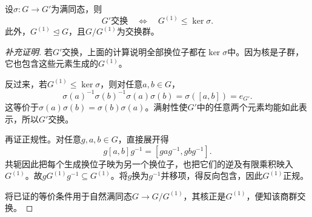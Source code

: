 \begin{theorem}\label{p2:abelianization}
设$\sigma:G\to G'$为满同态，则
\[
G'\text{交换}\quad\Longleftrightarrow\quad G^{(1)}\leq\ker\sigma.
\]
此外，$G^{(1)}\trianglelefteq G$，且$G/G^{(1)}$为交换群。
\end{theorem}
\begin{proof}[补充证明]
若$G'$交换，上面的计算说明全部换位子都在$\ker\sigma$中。因为核是子群，它也包含这些元素生成的$G^{(1)}$。

反过来，若$G^{(1)}\leq\ker\sigma$，则对任意$a,b\in G$，
\[
\sigma(a)^{-1}\sigma(b)^{-1}\sigma(a)\sigma(b)
=\sigma([a,b])=e_{G'}.
\]
这等价于$\sigma(a)\sigma(b)=\sigma(b)\sigma(a)$。满射性使$G'$中的任意两个元素均能如此表示，所以$G'$交换。

再证正规性。对任意$g,a,b\in G$，直接展开得
\[
g[a,b]g^{-1}=[gag^{-1},gbg^{-1}].
\]
共轭因此把每个生成换位子映为另一个换位子，也把它们的逆及有限乘积映入$G^{(1)}$。故$gG^{(1)}g^{-1}\subseteq G^{(1)}$。将$g$换为$g^{-1}$并移项，得反向包含，因此$G^{(1)}$正规。

将已证的等价条件用于自然满同态$G\to G/G^{(1)}$，其核正是$G^{(1)}$，便知该商群交换。
\end{proof}
